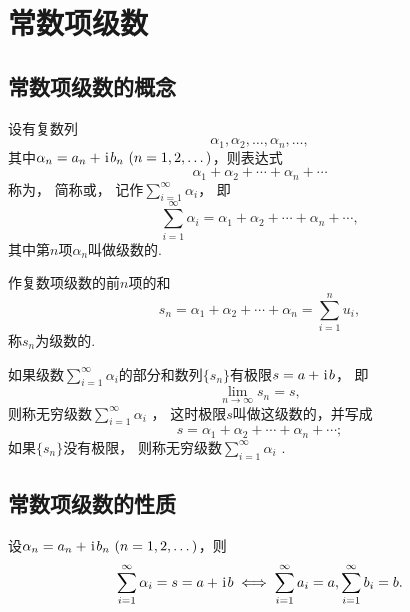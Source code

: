 \section{常数项级数}
\subsection{常数项级数的概念}
\begin{definition}
设有复数列\begin{equation*}
	\alpha_1,\alpha_2,\dotsc,\alpha_n,\dotsc,
\end{equation*}
其中\(\alpha_n=a_n+\iu b_n\ (n=1,2,\dotsc)\)，则表达式\begin{equation*}
	\alpha_1+\alpha_2+\dotsb+\alpha_n+\dotsb
\end{equation*}
称为，
简称或，
记作\(\sum_{i=1}^\infty \alpha_i\)，
即\begin{equation*}
	\sum_{i=1}^\infty \alpha_i = \alpha_1+\alpha_2+\dotsb+\alpha_n+\dotsb,
\end{equation*}
其中第\(n\)项\(\alpha_n\)叫做级数的.

作复数项级数的前\(n\)项的和\begin{equation*}
	s_n = \alpha_1+\alpha_2+\dotsb+\alpha_n = \sum_{i=1}^n{u_i},
\end{equation*}
称\(s_n\)为级数的.

如果级数\(\sum_{i=1}^\infty \alpha_i\)的部分和数列\(\{s_n\}\)有极限\(s=a+\kern1pt\mathrm{i}\kern1pt b\)，
即\begin{equation*}
	\lim_{n\to\infty}s_n = s,
\end{equation*}
则称无穷级数\(\sum_{i=1}^\infty \alpha_i\) ，
这时极限\(s\)叫做这级数的，并写成\begin{equation*}
	s = \alpha_1+\alpha_2+\dotsb+\alpha_n+\dotsb;
\end{equation*}
如果\(\{s_n\}\)没有极限，
则称无穷级数\(\sum_{i=1}^\infty \alpha_i\) .
\end{definition}

\subsection{常数项级数的性质}
\begin{theorem}\label{theorem:解析函数的级数表示.复级数与其实部及虚部级数的关系}
设\(\alpha_n=a_n+\iu b_n\ (n=1,2,\dots)\)，则\begin{equation*}
	\sum_{i=1}^\infty \alpha_i = s = a + \kern1pt\mathrm{i}\kern1pt b
	\iff
	\sum_{i=1}^\infty a_i = a,
	\sum_{i=1}^\infty b_i = b.
\end{equation*}
\end{theorem}

